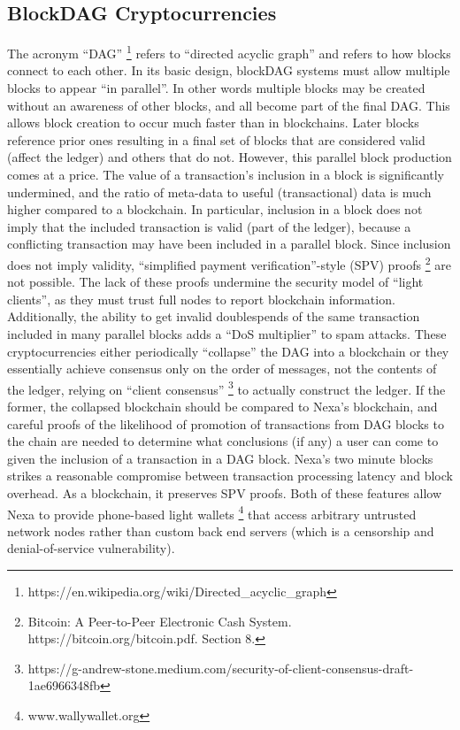\documentclass[a4paper, 11pt]{article}
\begin{document}
\subsection{BlockDAG Cryptocurrencies}
The acronym “DAG” \footnote{https://en.wikipedia.org/wiki/Directed\_acyclic\_graph} refers to “directed acyclic graph” and refers to how blocks connect to each other. In its basic design, blockDAG systems must allow multiple blocks to appear “in parallel”.  In other words multiple blocks may be created without an awareness of other blocks, and all become part of the final DAG.  This allows block creation to occur much faster than in blockchains.  Later blocks reference prior ones resulting in a final set of blocks that are considered valid (affect the ledger) and others that do not. 
However, this parallel block production comes at a price.  The value of a transaction’s inclusion in a block is significantly undermined, and the ratio of meta-data to useful (transactional) data is much higher compared to a blockchain.  In particular, inclusion in a block does not imply that the included transaction is valid (part of the ledger), because a conflicting transaction may have been included in a parallel block.  Since inclusion does not imply validity, “simplified payment verification”-style (SPV) proofs \footnote{Bitcoin: A Peer-to-Peer Electronic Cash System. https://bitcoin.org/bitcoin.pdf. Section 8.} are not possible.  The lack of these proofs undermine the security model of “light clients”, as they must trust full nodes to report blockchain information.  Additionally, the ability to get invalid doublespends of the same transaction included in many parallel blocks adds a “DoS multiplier” to spam attacks.
These cryptocurrencies either periodically “collapse” the DAG into a blockchain or they essentially achieve consensus only on the order of messages, not the contents of the ledger, relying on “client consensus” \footnote{https://g-andrew-stone.medium.com/security-of-client-consensus-draft-1ae6966348fb} to actually construct the ledger.  If the former, the collapsed blockchain should be compared to Nexa’s blockchain, and careful proofs of the likelihood of promotion of transactions from DAG blocks to the chain are needed to determine what conclusions (if any) a user can come to given the inclusion of a transaction in a DAG block.
Nexa’s two minute blocks strikes a reasonable compromise between transaction processing latency and block overhead.  As a blockchain, it preserves SPV proofs.  Both of these features allow Nexa to provide phone-based light wallets \footnote{www.wallywallet.org} that access arbitrary untrusted network nodes rather than custom back end servers (which is a censorship and denial-of-service vulnerability).
\end{document}
